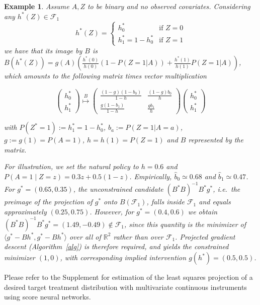 \documentclass[12pt]{article}
\theoremstyle{thmstyleone}%
\theoremstyle{thmstyletwo}%
\newtheorem{example}{Example}%
\theoremstyle{thmstylethree}%
\begin{document}
\begin{example}
Assume $A,Z$ to be binary and no observed covariates. Considering any $h^*(Z) \in \mathcal{F}_1$ 
	$$ h^*(Z) =\begin{cases}
		h^*_0 & \text{if } Z = 0  \\
		h^*_1  = 1- h^* _0 & \text{if } Z=1
	\end{cases} $$ we have that its image by $B$ is	$B(h^*(Z)) = g(A)\left(\frac{h^*(0)}{h(0)}(1-P(Z=1|A)) + \frac{h^*(1)}{h(1)}P(Z=1|A) \right) $, which amounts to the following matrix times vector multiplication
	
	
	\[
	\begin{pmatrix}
		h_0^* \\
		h_1^*
	\end{pmatrix} \overset{B}{\longmapsto}
	\begin{pmatrix}
		\displaystyle\frac{(1 - g)(1 - b_0)}{1 - h} & \displaystyle\frac{(1 - g) b_0}{h} \\
		\displaystyle\frac{g(1 - b_1)}{1 - h} & \displaystyle\frac{g b_1}{h}
	\end{pmatrix}
	\begin{pmatrix}
		h_0^* \\
		h_1^*
	\end{pmatrix}
	\]
	
	with $P(Z^*=1):=h^*_1= 1-h^*_0$, $b_a:=P(Z=1|A=a)$, $g:=g(1)=P(A=1)$, $h=h(1)=P(Z=1)$ and $B$ represented by the matrix. 
	
	
	
	 {For illustration, we set the natural policy to $h=0.6$ and $P(A=1\mid Z=z) = 0.3z + 0.5(1-z)$. Empirically, $\hat{b}_0 \simeq 0.68$ and $\hat{b}_1 \simeq 0.47$. For $g^*=(0.65,0.35)$, the unconstrained candidate $(B^*B)^{-1}B^*g^*$, i.e.\ the preimage of the projection of $g^*$ onto $B(\mathcal{F}_1)$, falls inside $\mathcal{F}_1$ and equals approximately $(0.25,0.75)$. However, for $g^*=(0.4,0.6)$ we obtain $(B^*B)^{-1}B^*g^* = (1.49,-0.49) \notin \mathcal{F}_1$, since this quantity is the minimizer of $\langle g^*-Bh^*, g^*-Bh^*\rangle$ over all of $\mathbb{R}^2$ rather than over $\mathcal{F}_1$. Projected gradient descent (Algorithm~\ref{alg}) is therefore required, and yields the constrained minimizer $(1,0)$, with corresponding implied intervention $g(h^*) = (0.5,0.5)$.}
	
	
\end{example}




Please refer to the Supplement for estimation of the least squares projection of a desired target treatment distribution with multivariate continuous instruments using score neural networks.
\end{document}
